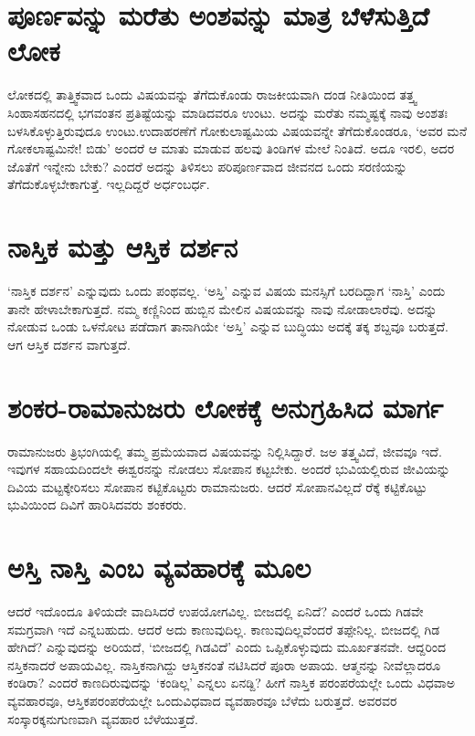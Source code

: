 \section*{ಪೂರ್ಣವನ್ನು ಮರೆತು ಅಂಶವನ್ನು ಮಾತ್ರ ಬೆಳೆಸುತ್ತಿದೆ ಲೋಕ}

ಲೋಕದಲ್ಲಿ ತಾತ್ತ್ವಿಕವಾದ ಒಂದು ವಿಷಯವನ್ನು ತೆಗೆದುಕೊಂಡು ರಾಜಕೀಯವಾಗಿ ದಂಡ ನೀತಿಯಿಂದ ತತ್ತ್ವ ಸಿಂಹಾಸಹನದಲ್ಲಿ ಭಗವಂತನ ಪ್ರತಿಷ್ಟೆಯನ್ನು ಮಾಡಿದವರೂ ಉಂಟು. ಅದನ್ನು ಮರೆತು ನಮ್ಮಷ್ಟಕ್ಕೆ ನಾವು ಅಂಶತಃ ಬಳಸಿಕೊಳ್ಳುತ್ತಿರುವುದೂ ಉಂಟು.ಉದಾಹರಣೆಗೆ ಗೋಕುಲಾಷ್ಟಮಿಯ ವಿಷಯವನ್ನೇ ತೆಗೆದುಕೊಂಡರೂ, `ಅವರ ಮನೆ ಗೋಕಲಾಷ್ಟಮಿನೇ! ಬಿಡು' ಅಂದರೆ ಆ ಮಾತು ಮಾಡುವ ಹಲವು ತಿಂಡಿಗಳ ಮೇಲೆ ನಿಂತಿದೆ. ಅದೂ ಇರಲಿ, ಅದರ ಜೊತೆಗೆ ಇನ್ನೇನು ಬೇಕು? ಎಂದರೆ ಅದನ್ನು ತಿಳಿಸಲು ಪರಿಪೂರ್ಣವಾದ ಜೀವನದ ಒಂದು ಸರಣಿಯನ್ನು ತೆಗೆದುಕೊಳ್ಳಬೇಕಾಗುತ್ತೆ. ಇಲ್ಲದಿದ್ದರೆ ಅರ್ಧಂಬರ್ಧ.

\section*{ನಾಸ್ತಿಕ ಮತ್ತು ಆಸ್ತಿಕ ದರ್ಶನ}

`ನಾಸ್ತಿಕ ದರ್ಶನ' ಎನ್ನುವುದು ಒಂದು ಪಂಥವಲ್ಲ. `ಅಸ್ತಿ' ಎನ್ನುವ ವಿಷಯ ಮನಸ್ಸಿಗೆ ಬರದಿದ್ದಾಗ `ನಾಸ್ತಿ' ಎಂದು ತಾನೇ ಹೇಳಾಬೇಕಾಗುತ್ತದೆ. ನಮ್ಮ ಕಣ್ಣಿನಿಂದ ಹುಬ್ಬಿನ ಮೇಲಿನ ವಿಷಯವನ್ನು ನಾವು ನೋಡಾಲಾರೆವು. ಅದನ್ನು ನೋಡುವ ಒಂಡು ಒಳನೋಟ ಪಡೆದಾಗ ತಾನಾಗಿಯೇ `ಅಸ್ತಿ' ಎನ್ನುವ ಬುದ್ಧಿಯು ಅದಕ್ಕೆ ತಕ್ಕ ಶಬ್ದವೂ ಬರುತ್ತದೆ. ಆಗ ಆಸ್ತಿಕ ದರ್ಶನ ವಾಗುತ್ತದೆ.

\section*{ಶಂಕರ-ರಾಮಾನುಜರು ಲೋಕಕ್ಕೆ ಅನುಗ್ರಹಿಸಿದ ಮಾರ್ಗ}

ರಾಮಾನುಜರು ತ್ರಿಭಂಗಿಯಲ್ಲಿ ತಮ್ಮ ಪ್ರಮೆಯವಾದ ವಿಷಯವನ್ನು ನಿಲ್ಲಿಸಿದ್ದಾರೆ. ಜಅ ತತ್ತ್ವವಿದೆ, ಜೀವವೂ ಇದೆ. ಇವುಗಳ ಸಹಾಯದಿಂದಲೇ ಈಶ್ವರನನ್ನು ನೋಡಲು ಸೋಪಾನ ಕಟ್ಟಬೇಕು. ಅಂದರೆ ಭುವಿಯಲ್ಲಿರುವ ಜೀವಿಯನ್ನು ದಿವಿಯ ಮಟ್ಟಕ್ಕೇರಿಸಲು ಸೋಪಾನ ಕಟ್ಟಿಕೊಟ್ಟರು ರಾಮಾನುಜರು. ಆದರೆ ಸೋಪಾನವಿಲ್ಲದೆ ರೆಕ್ಕೆ  ಕಟ್ಟಿಕೊಟ್ಟು ಭುವಿಯಿಂದ ದಿವಿಗೆ ಹಾರಿಸಿದವರು ಶಂಕರರು.

\section*{ಅಸ್ತಿ ನಾಸ್ತಿ ಎಂಬ ವ್ಯವಹಾರಕ್ಕೆ ಮೂಲ}

ಆದರೆ ಇದೊಂದೂ ತಿಳಿಯದೇ ವಾದಿಸಿದರೆ ಉಪಯೋಗವಿಲ್ಲ. ಬೀಜದಲ್ಲಿ ಏನಿದೆ? ಎಂದರೆ ಒಂದು ಗಿಡವೇ ಸಮಗ್ರವಾಗಿ ಇದೆ ಎನ್ನಬಹುದು. ಆದರೆ ಅದು ಕಾಣುವುದಿಲ್ಲ. ಕಾಣುವುದಿಲ್ಲವೆಂದರೆ ತಪ್ಪೇನಿಲ್ಲ. ಬೀಜದಲ್ಲಿ ಗಿಡ ಹೇಗಿದೆ? ಎನ್ನುವುದನ್ನು ಅರಿಯದೆ, `ಬೀಜದಲ್ಲಿ ಗಿಡವಿದೆ' ಎಂದು ಒಪ್ಪಿಕೊಳ್ಳುವುದು ಮೂರ್ಖತನವೇ. ಆದ್ದರಿಂದ ನಸ್ತಿಕನಾದರೆ ಅಪಾಯವಿಲ್ಲ. ನಾಸ್ತಿಕನಾಗಿದ್ದು ಆಸ್ತಿಕನಂತೆ ನಟಿಸಿದರೆ ಪೂರಾ ಅಪಾಯ. ಆತ್ಮನನ್ನು ನೀವೆಲ್ಲಾದರೂ ಕಂಡಿರಾ? ಎಂದರೆ ಕಾಣದಿರುವುದನ್ನು `ಕಂಡಿಲ್ಲ' ಎನ್ನಲು ಏನಡ್ದಿ? ಹೀಗೆ ನಾಸ್ತಿಕ ಪರಂಪರೆಯಲ್ಲೇ ಒಂದು ವಿಧವಾಅ ವ್ಯವಹಾರವೂ, ಆಸ್ತಿಕಪರಂಪರೆಯಲ್ಲೇ ಒಂದುವಿಧವಾದ ವ್ಯವಹಾರವೂ ಬೆಳೆದು ಬರುತ್ತದೆ. ಅವರವರ ಸಂಸ್ಕಾರಕ್ಕನುಗುಣವಾಗಿ ವ್ಯವಹಾರ ಬೆಳೆಯುತ್ತದೆ.


